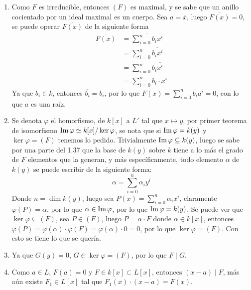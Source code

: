 \begin{sol}{1.51}
    \begin{enumerate}
        \item Como \(F\) es irreducible, entonces \((F)\) es maximal, y se sabe que un anillo cocientado por un ideal maximal es un cuerpo. Sea \(a=\overline{x}\), luego \(\overline{F(x)}=0\), se puede operar \(\overline{F(x)}\) de la siguiente forma
              \begin{align*}
                  \overline{F(x)} & =\overline{\sum_{i=0}^nb_ix^i}                 \\
                                  & =\sum_{i=0}^n\overline{b_ix^i}                 \\
                                  & =\sum_{i=0}^n\overline{b_i}\overline{x^i}      \\
                                  & =\sum_{i=0}^n\overline{b_i}\cdot\overline{x}^i
              \end{align*}
              Ya que \(b_i\in k\), entonces \(\overline{b_i}=b_i\), por lo que \(\overline{F(x)}=\sum_{i=0}^nb_ia^i=0\), con lo que \(a\) es una raíz.
        \item Se denota \(\varphi\) el homorfismo, de \(k[x]\) a \(L'\) tal que \(x\mapsto y\), por primer teorema de isomorfismo \(\operatorname{Im}\varphi\simeq k[x]/\ker\varphi\), se nota que si \(\operatorname{Im}\varphi=k(y)\) y \(\ker\varphi=(F)\) tenemos lo pedido. Trivialmente \(\operatorname{Im}\varphi\subseteq k(y)\), luego se sabe por una parte del 1.37 que la base de \(k(y)\) sobre \(k\) tiene a lo más el grado de \(F\) elementos que la generan, y más específicamente, todo elemento \(\alpha\) de \(k(y)\) se puede escribir de la siguiente forma:
              \[
                  \alpha = \sum_{i=0}^n\alpha_iy^i
              \]
              Donde \(n=\dim k(y)\), luego sea \(P(x)=\sum_{i=0}^n\alpha_ix^i\), claramente \(\varphi(P)=\alpha\), por lo que \(\alpha\in\operatorname{Im}\varphi\), por lo que \(\operatorname{Im}\varphi=k(y)\). Se puede ver que \(\ker\varphi\subseteq (F)\), sea \(P\in (F)\), luego \(P=\alpha\cdot F\) donde \(\alpha\in k[x]\), entonces \(\varphi(P)=\varphi(\alpha)\cdot\varphi(F)=\varphi(\alpha)\cdot0=0\), por lo que \(\ker\varphi=(F)\). Con esto se tiene lo que se quería.
        \item Ya que \(G(y)=0\), \(G\in \ker\varphi=(F)\), por lo que \(F\mid G\).
        \item Como \(a\in L\), \(F(a)=0\) y \(F\in k[x]\subset L[x]\), entonces \((x-a)\mid F\), más aún existe \(F_1\in L[x]\) tal que \(F_1(x)\cdot(x-a)=F(x)\).
    \end{enumerate}
\end{sol}

